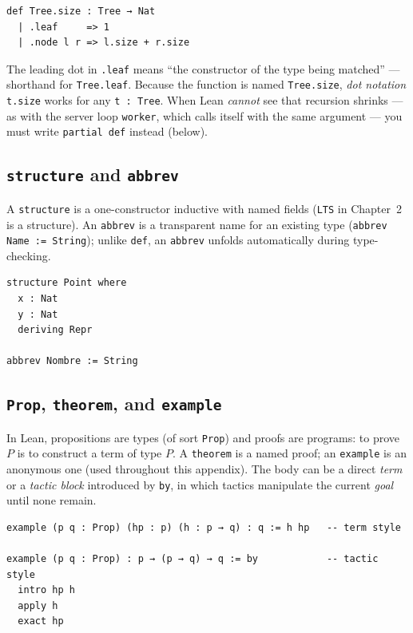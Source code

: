 \documentclass[11pt, a4paper, oneside]{book}
\newcommand{\lc}[1]{\texttt{#1}}
\begin{document}
\begin{leanbox}
\begin{verbatim}
def Tree.size : Tree → Nat
  | .leaf     => 1
  | .node l r => l.size + r.size
\end{verbatim}
\end{leanbox}

The leading dot in \lc{.leaf} means ``the constructor of the type being
matched'' --- shorthand for \lc{Tree.leaf}. Because the function is named
\lc{Tree.size}, \emph{dot notation} \lc{t.size} works for any \lc{t : Tree}.
When Lean \emph{cannot} see that recursion shrinks --- as with the server loop
\lc{worker}, which calls itself with the same argument --- you must write
\lc{partial def} instead (below).

\subsection*{\lc{structure} and \lc{abbrev}}

A \lc{structure} is a one-constructor inductive with named fields (\lc{LTS} in
Chapter~2 is a structure). An \lc{abbrev} is a transparent name for an existing
type (\lc{abbrev Name := String}); unlike \lc{def}, an \lc{abbrev} unfolds
automatically during type-checking.

\begin{leanbox}
\begin{verbatim}
structure Point where
  x : Nat
  y : Nat
  deriving Repr

abbrev Nombre := String
\end{verbatim}
\end{leanbox}

\subsection*{\lc{Prop}, \lc{theorem}, and \lc{example}}

In Lean, propositions are types (of sort \lc{Prop}) and proofs are programs: to
prove $P$ is to construct a term of type $P$. A \lc{theorem} is a named proof;
an \lc{example} is an anonymous one (used throughout this appendix). The body
can be a direct \emph{term} or a \emph{tactic block} introduced by \lc{by}, in
which tactics manipulate the current \emph{goal} until none remain.

\begin{leanbox}
\begin{verbatim}
example (p q : Prop) (hp : p) (h : p → q) : q := h hp   -- term style

example (p q : Prop) : p → (p → q) → q := by            -- tactic style
  intro hp h
  apply h
  exact hp
\end{verbatim}
\end{leanbox}
\end{document}
